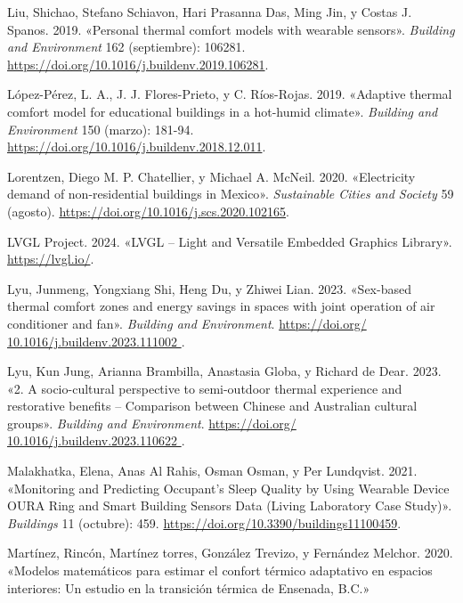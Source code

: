 \documentclass[
  12pt,
  letterpaper,
  DIV=11,
  numbers=noendperiod]{scrreport}
\newlength{\cslhangindent}
\newlength{\cslentryspacingunit} %
\newenvironment{CSLReferences}[2] %
 {%
  \setlength{\parindent}{0pt}
  \ifodd #1
  \let\oldpar\par
  \def\par{\hangindent=\cslhangindent\oldpar}
  \fi
  \setlength{\parskip}{#2\cslentryspacingunit}
 }%
 {}
\begin{document}
\begin{CSLReferences}{1}{0}
\leavevmode{}%
Liu, Shichao, Stefano Schiavon, Hari Prasanna Das, Ming Jin, y Costas J.
Spanos. 2019. {«Personal thermal comfort models with wearable sensors»}.
\emph{Building and Environment} 162 (septiembre): 106281.
\url{https://doi.org/10.1016/j.buildenv.2019.106281}.

\leavevmode{}%
López-Pérez, L. A., J. J. Flores-Prieto, y C. Ríos-Rojas. 2019.
{«Adaptive thermal comfort model for educational buildings in a
hot-humid climate»}. \emph{Building and Environment} 150 (marzo):
181-94. \url{https://doi.org/10.1016/j.buildenv.2018.12.011}.

\leavevmode{}%
Lorentzen, Diego M. P. Chatellier, y Michael A. McNeil. 2020.
{«Electricity demand of non-residential buildings in Mexico»}.
\emph{Sustainable Cities and Society} 59 (agosto).
\url{https://doi.org/10.1016/j.scs.2020.102165}.

\leavevmode{}%
LVGL Project. 2024. {«{LVGL -- Light and Versatile Embedded Graphics
Library}»}. \url{https://lvgl.io/}.

\leavevmode{}%
Lyu, Junmeng, Yongxiang Shi, Heng Du, y Zhiwei Lian. 2023. {«Sex-based
thermal comfort zones and energy savings in spaces with joint operation
of air conditioner and fan»}. \emph{Building and Environment}.
\href{https://doi.org/\%2010.1016/j.buildenv.2023.111002\%20}{https://doi.org/
10.1016/j.buildenv.2023.111002 }.

\leavevmode{}%
Lyu, Kun Jung, Arianna Brambilla, Anastasia Globa, y Richard de Dear.
2023. {«2. A socio-cultural perspective to semi-outdoor thermal
experience and restorative benefits -- Comparison between Chinese and
Australian cultural groups»}. \emph{Building and Environment}.
\href{https://doi.org/\%2010.1016/j.buildenv.2023.110622\%20}{https://doi.org/
10.1016/j.buildenv.2023.110622 }.

\leavevmode{}%
Malakhatka, Elena, Anas Al Rahis, Osman Osman, y Per Lundqvist. 2021.
{«Monitoring and Predicting Occupant's Sleep Quality by Using Wearable
Device OURA Ring and Smart Building Sensors Data (Living Laboratory Case
Study)»}. \emph{Buildings} 11 (octubre): 459.
\url{https://doi.org/10.3390/buildings11100459}.

\leavevmode{}%
Martínez, Rincón, Martínez torres, González Trevizo, y Fernández
Melchor. 2020. {«Modelos matemáticos para estimar el confort térmico
adaptativo en espacios interiores: Un estudio en la transición térmica
de Ensenada, B.C.»}


\end{CSLReferences}
\end{document}
